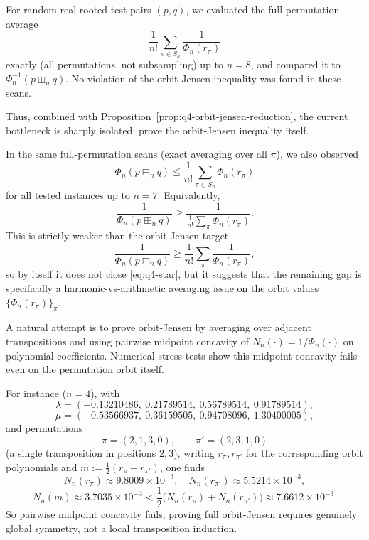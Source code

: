 \begin{remark}
For random real-rooted test pairs $(p,q)$, we evaluated the full-permutation average
\[
\frac1{n!}\sum_{\pi\in S_n}\frac1{\Phi_n(r_\pi)}
\]
exactly (all permutations, not subsampling) up to $n=8$,
and compared it to $\Phi_n^{-1}(p\boxplus_n q)$.
No violation of the orbit-Jensen inequality was found in these scans.

Thus, combined with Proposition~\ref{prop:q4-orbit-jensen-reduction},
the current bottleneck is sharply isolated:
prove the orbit-Jensen inequality itself.
\end{remark}

\begin{remark}
In the same full-permutation scans (exact averaging over all $\pi$),
we also observed
\[
\Phi_n(p\boxplus_n q)
\le
\frac1{n!}\sum_{\pi\in S_n}\Phi_n(r_\pi)
\]
for all tested instances up to $n=7$.
Equivalently,
\[
\frac1{\Phi_n(p\boxplus_n q)}
\ge
\frac{1}{\frac1{n!}\sum_{\pi}\Phi_n(r_\pi)}.
\]
This is strictly weaker than the orbit-Jensen target
\[
\frac1{\Phi_n(p\boxplus_n q)}
\ge
\frac1{n!}\sum_{\pi}\frac1{\Phi_n(r_\pi)},
\]
so by itself it does not close \eqref{eq:q4-star}, but it suggests that
the remaining gap is specifically a harmonic-vs-arithmetic averaging issue
on the orbit values $\{\Phi_n(r_\pi)\}_\pi$.
\end{remark}

\begin{remark}
A natural attempt is to prove orbit-Jensen by averaging over adjacent
transpositions and using pairwise midpoint concavity of
$N_n(\cdot)=1/\Phi_n(\cdot)$ on polynomial coefficients.
Numerical stress tests show this midpoint concavity fails even on
the permutation orbit itself.

For instance ($n=4$), with
\[
\lambda=(-0.13210486,\ 0.21789514,\ 0.56789514,\ 0.91789514),
\]
\[
\mu=(-0.53566937,\ 0.36159505,\ 0.94708096,\ 1.30400005),
\]
and permutations
\[
\pi=(2,1,3,0),\qquad \pi'=(2,3,1,0)
\]
(a single transposition in positions $2,3$), writing
$r_\pi,r_{\pi'}$ for the corresponding orbit polynomials and
$m:=\frac12(r_\pi+r_{\pi'})$, one finds
\[
N_n(r_\pi)\approx 9.8009\times 10^{-3},\quad
N_n(r_{\pi'})\approx 5.5214\times 10^{-3},
\]
\[
N_n(m)\approx 3.7035\times 10^{-3}
<
\frac12\bigl(N_n(r_\pi)+N_n(r_{\pi'})\bigr)
\approx 7.6612\times 10^{-3}.
\]
So pairwise midpoint concavity fails; proving full orbit-Jensen
requires genuinely global symmetry, not a local transposition induction.
\end{remark}

